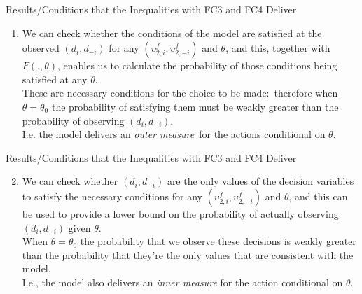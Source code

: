 \documentclass[aspectratio=169,11pt]{beamer}
\begin{document}
\begin{frame}{\normalsize Results/Conditions that the Inequalities with FC3 and FC4 Deliver}

\begin{enumerate}
\item We can check whether the conditions of the model are satisfied at the
observed $(d_{i},d_{-i})$ for any $(\upsilon _{2,i}^{f},\upsilon
_{2,-i}^{f}) $ and $\theta $, and this, together with $F(.,\theta )$,
enables us to calculate the probability of those conditions being satisfied
at any $\theta $. \\
\vspace{0.2 in} 
These are necessary conditions for the choice to be made:\
therefore when $\theta =\theta _{0}$ the probability of satisfying them must
be weakly greater than the probability of observing $(d_{i},d_{-i})$. \\
\vspace{0.2 in} 
I.e. the model delivers an \textit{outer measure}\ for the actions conditional on $%
\theta $.
\end{enumerate}
\end{frame}

\begin{frame}{\normalsize Results/Conditions that the Inequalities with FC3 and FC4 Deliver}
\begin{enumerate}
\setcounter{enumi}{1}
\item We can check whether $(d_{i},d_{-i})$ are the only values of the
decision variables to satisfy the necessary conditions for any $(\upsilon
_{2,i}^{f},\upsilon _{2,-i}^{f})$ and $\theta $, and this can be used to
provide a lower bound on the probability of actually observing $%
(d_{i},d_{-i})$ given $\theta $. \\
\vspace{0.2in}
When $\theta =\theta _{0}$ the probability
that we observe these decisions is weakly greater than the probability that
they're the only values that are consistent with the model. \\
\vspace{0.2 in} 
I.e., the model also delivers an \textit{inner measure} for the action conditional on $\theta $.
\end{enumerate}
\end{frame}
\end{document}
